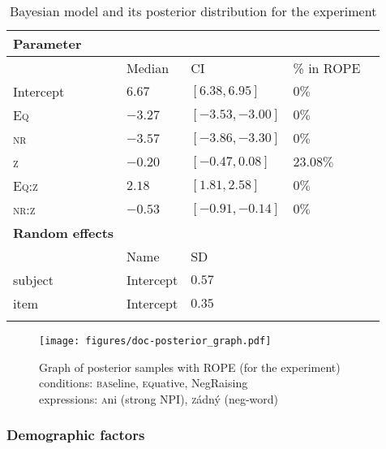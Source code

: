 \documentclass[output=paper,colorlinks,citecolor=brown]{langscibook}
\begin{document}
\begin{table}
  \begin{tabularx}{.9\textwidth}{lYYYr}
  \lsptoprule
  \textbf{Parameter}&\\\midrule
    &            Median & CI &  \% in ROPE\\  
    Intercept               &$6.67$   &$[6.38,6.95]$ &$0\%$\\  
    \textsc{Eq}               &$-3.27$   &$[-3.53,-3.00]$ &$0\%$\\  
    \textsc{nr}               &$-3.57$   &$[-3.86, -3.30]$ &  $0\%$\\  
    \textsc{z}               &$-0.20$   &$[-0.47,  0.08]$ &$23.08\%$\\  
    \textsc{Eq:z}               &$2.18$   &$[1.81,  2.58]$   &$0\%$\\
    \textsc{nr:z}               &$-0.53$   &$[-0.91, -0.14]$   &$0\%$\\  
    \bottomrule
    \textbf{Random effects}&\\\midrule
    & Name &SD\\
    subject&Intercept&$0.57$\\
    item&Intercept&$0.35$\\
  \lspbottomrule
  \end{tabularx}
  \caption{Bayesian model and its posterior distribution for the experiment}%
  \label{tab:exp1}
\end{table}

\begin{figure}
  \caption{Graph of posterior samples with ROPE (for the experiment)\\conditions: \textsc{bas}eline, \textsc{eq}uative, \textsc{N}eg\textsc{R}aising\\expressions: \textsc{a}ni (strong NPI), \textsc{z}ádný (neg-word)}
  \texttt{[image: figures/doc-posterior\_graph.pdf]}
  \label{fig-rope}
\end{figure}

\subsubsection{Demographic factors}
\end{document}
